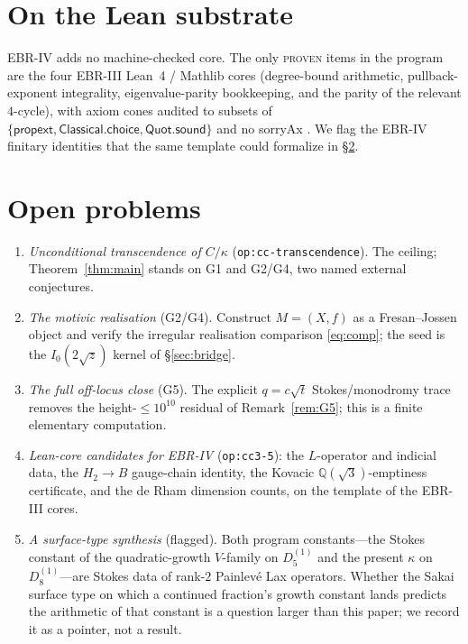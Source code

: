 \documentclass[11pt,reqno]{amsart}
\theoremstyle{plain}
\theoremstyle{definition}
\theoremstyle{remark}
\newcommand{\Q}{\mathbb{Q}}
\newcommand{\Htwo}{H_{2}}
\begin{document}
\section{On the Lean substrate}\label{sec:lean}
EBR-IV adds no machine-checked core. The only \textsc{proven} items in the
program are the four EBR-III Lean~4 / Mathlib cores (degree-bound arithmetic,
pullback-exponent integrality, eigenvalue-parity bookkeeping, and the parity of
the relevant $4$-cycle), with axiom cones audited to subsets of
$\{\textsf{propext},\textsf{Classical.choice},\textsf{Quot.sound}\}$ and no
\textsf{sorryAx} \cite{EBRIII,Mathlib}. We flag the EBR-IV finitary identities
that the same template could formalize in \S\ref{sec:open}.

\section{Open problems}\label{sec:open}
\begin{enumerate}
\item \emph{Unconditional transcendence of $C/\kappa$} (\texttt{op:cc-transcendence}).
The ceiling; Theorem~\ref{thm:main} stands on G1 and G2/G4, two named external
conjectures.
\item \emph{The motivic realisation} (G2/G4). Construct $M=(X,f)$ as a
Fresan--Jossen object and verify the irregular realisation comparison
\eqref{eq:comp}; the seed is the $I_{0}(2\sqrt z)$ kernel of
\S\ref{sec:bridge}.
\item \emph{The full off-locus close} (G5). The explicit $q=c\sqrt{t}$
Stokes/monodromy trace removes the height-$\le10^{10}$ residual of
Remark~\ref{rem:G5}; this is a finite elementary computation.
\item \emph{Lean-core candidates for EBR-IV} (\texttt{op:cc3-5}): the
$L$-operator and indicial data, the $\Htwo\to B$ gauge-chain identity, the
Kovacic $\Q(\sqrt3)$-emptiness certificate, and the de Rham dimension counts,
on the template of the EBR-III cores.
\item \emph{A surface-type synthesis} (flagged). Both program constants---the
Stokes constant of the quadratic-growth $V$-family on $D_{5}^{(1)}$ and the
present $\kappa$ on $D_{8}^{(1)}$---are Stokes data of rank-$2$ Painlev\'e Lax
operators. Whether the Sakai surface type on which a continued fraction's growth
constant lands predicts the arithmetic of that constant is a question larger
than this paper; we record it as a pointer, not a result.
\end{enumerate}
\end{document}
